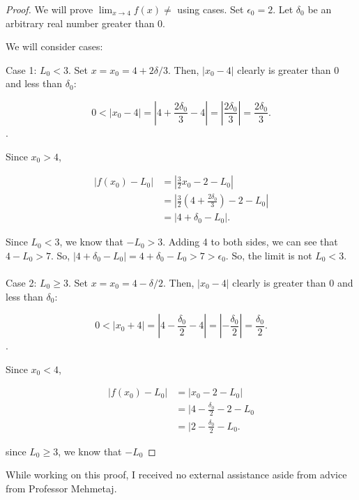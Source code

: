\documentclass[12pt]{article}
\begin{document}
\begin{proof}
    We will prove $\lim_{x\to 4} f(x)\neq $ using cases. Set $\epsilon_0 = 2$. Let $\delta_0$ be an arbitrary real number greater than 0.

    We will consider cases:

    \noindent Case 1: $L_0 < 3$. Set $x = x_0 = 4 + 2\delta/3$. Then, $|x_0 - 4|$ clearly is greater than 0 and less than $\delta_0$:

    $$0 < |x_0 - 4| = |4 + \frac{2\delta_0}{3} - 4| = |\frac{2\delta_0}{3}| = \frac{2\delta_0}{3}.$$.

    Since $x_0 > 4$, 

    \begin{align*}
        |f(x_0) - L_0| & = |\frac{3}{2}x_0 - 2 - L_0| \\
        & = |\frac{3}{2}(4 + \frac{2\delta_0}{3}) - 2 - L_0| \\
        & = |4 + \delta_0 - L_0|.
    \end{align*}

    Since $L_0 < 3$, we know that $-L_0 > 3$. Adding 4 to both sides, we can see that $4-L_0 > 7$. So, $|4 + \delta_0 - L_0| =  4 + \delta_0 - L_0 > 7 > \epsilon_0$. So, the limit is not $L_0 < 3$. \\ \\

    \noindent Case 2: $L_0 \geq 3$. Set $x = x_0 = 4 - \delta/2$. Then, $|x_0 - 4|$ clearly is greater than 0 and less than $\delta_0$:

    $$0 < |x_0 + 4| = |4 - \frac{\delta_0}{2} - 4| = |-\frac{\delta_0}{2}| = \frac{\delta_0}{2}.$$.

    Since $x_0 < 4$,

    \begin{align*}
        |f(x_0) - L_0| & = |x_0 - 2 - L_0| \\
        & = |4 - \frac{\delta_0}{2} - 2 - L_0 \\
        & = |2 - \frac{\delta_0}{2} - L_0.
    \end{align*}

    since $L_0 \geq 3$, we know that $-L_0$

\end{proof}

\noindent While working on this proof, I received no external assistance aside from advice from Professor Mehmetaj.
\end{document}
